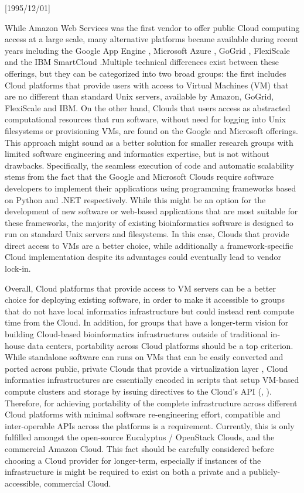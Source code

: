 \NeedsTeXFormat{LaTeX2e}[1995/12/01] \documentclass[10pt]{bmc_article}
\newenvironment{bmcformat}{\begin{raggedright}\baselineskip20pt\sloppy\setboolean{publ}{false}}{\end{raggedright}\baselineskip20pt\sloppy}
\begin{document}
\begin{bmcformat}
While Amazon Web Services \cite{aws} was the first vendor to offer public Cloud computing access at a large scale, 
many alternative platforms became available during recent years including the Google App Engine \cite{appengine}, Microsoft 
Azure \cite{azure}, GoGrid \cite{gogrid},  FlexiScale \cite{flexiscale} and the IBM SmartCloud \cite{smartcloud}.Multiple 
technical differences exist between these offerings, but they can be categorized into two broad groups: the first includes
Cloud platforms that provide users with access to Virtual Machines (VM) that are no different than standard Unix servers, available 
by Amazon, GoGrid, FlexiScale and IBM. On the other hand, Clouds that users access as abstracted computational resources that 
run software, without need for logging into Unix filesystems or provisioning VMs, are found on the Google and Microsoft offerings. 
This approach might sound as a better solution for smaller research groups with limited software engineering and informatics 
expertise, but is not without drawbacks. Specifically, the seamless execution of code and automatic scalability stems from the
fact that the Google and Microsoft Clouds require software developers to implement their applications using programming 
frameworks based on Python \cite{python} and .NET \cite{net} respectively. While this might be an option for the development of 
new software or web-based applications that are most suitable for these frameworks, the majority of existing 
bioinformatics software is designed to run on standard Unix servers and filesystems. In this case, Clouds that provide direct 
access to VMs are a better choice, while additionally a framework-specific Cloud implementation despite its advantages could 
eventually lead to vendor lock-in. \pb

Overall, Cloud platforms that provide access to VM servers can be a better choice for deploying existing software, in order 
to make it accessible to groups that do not have local informatics infrastructure but could instead rent compute time from 
the Cloud. In addition, for groups that have a longer-term vision for building Cloud-based bioinformatics infrastructures 
outside of traditional in-house data centers, portability across Cloud platforms should be a top criterion. While standalone 
software  can runs on VMs that can be easily converted and ported across public, private Clouds that provide a virtualization 
layer \cite{Krampis2012}, Cloud informatics infrastructures are essentially encoded in scripts that setup VM-based compute 
clusters and storage by issuing directives to the Cloud's API (\cite{Afgan2010}, \cite{scriptaws}). Therefore, for achieving 
portability of the complete infrastructure across different Cloud platforms with minimal software re-engineering effort, 
compatible and inter-operable APIs across the platforms is a requirement. Currently, this is only fulfilled amongst the open-source 
Eucalyptus / OpenStack Clouds, and the commercial Amazon Cloud. This fact should be carefully considered before choosing 
a Cloud provider for longer-term, especially if instances of the infrastructure is might be required to exist on both a private 
and a publicly-accessible, commercial Cloud. \pb


\end{bmcformat}
\end{document}
